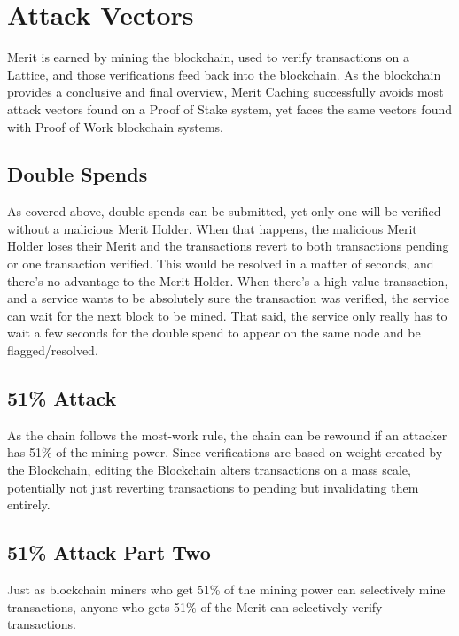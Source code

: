 \documentclass[14pt]{article}
\begin{document}
\newpage

\label{sec:3}
\section{Attack Vectors}
Merit is earned by mining the blockchain, used to verify transactions on a Lattice, and those verifications feed back into the blockchain. As the blockchain provides a conclusive and final overview, Merit Caching successfully avoids most attack vectors found on a Proof of Stake system, yet faces the same vectors found with Proof of Work blockchain systems.

\label{sec:3.1}
\subsection{Double Spends}
As covered above, double spends can be submitted, yet only one will be verified without a malicious Merit Holder. When that happens, the malicious Merit Holder loses their Merit and the transactions revert to both transactions pending or one transaction verified. This would be resolved in a matter of seconds, and there's no advantage to the Merit Holder. When there's a high-value transaction, and a service wants to be absolutely sure the transaction was verified, the service can wait for the next block to be mined. That said, the service only really has to wait a few seconds for the double spend to appear on the same node and be flagged/resolved.

\label{sec:3.2}
\subsection{51\% Attack}
As the chain follows the most-work rule, the chain can be rewound if an attacker has 51\% of the mining power. Since verifications are based on weight created by the Blockchain, editing the Blockchain alters transactions on a mass scale, potentially not just reverting transactions to pending but invalidating them entirely.

\label{sec:3.3}
\subsection{51\% Attack Part Two}
Just as blockchain miners who get 51\% of the mining power can selectively mine transactions, anyone who gets 51\% of the Merit can selectively verify transactions.
\end{document}
